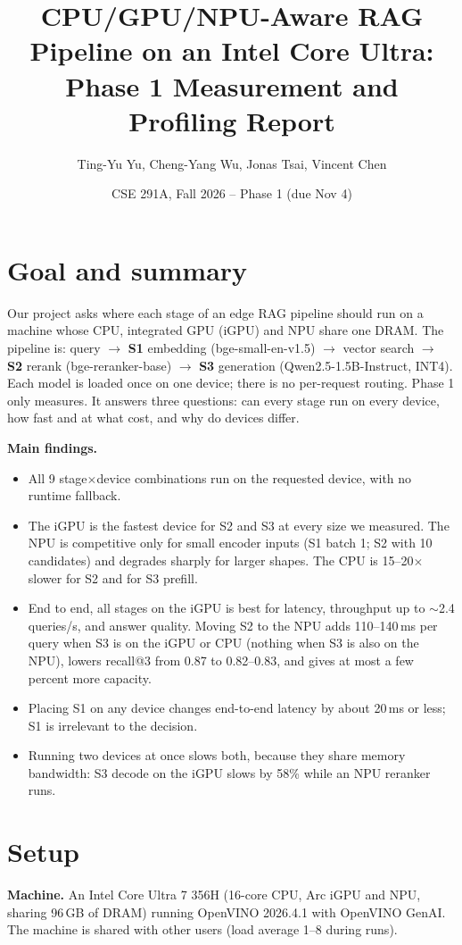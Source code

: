 \documentclass[10pt]{article}
\title{\vspace{-1em}CPU/GPU/NPU-Aware RAG Pipeline on an Intel Core Ultra:\\Phase 1 Measurement and Profiling Report}
\author{Ting-Yu Yu, Cheng-Yang Wu, Jonas Tsai, Vincent Chen}
\date{CSE 291A, Fall 2026 \;--\; Phase 1 (due Nov 4)}
\begin{document}
\maketitle
\vspace{-2em}

\section{Goal and summary}
Our project asks where each stage of an edge RAG pipeline should run on a machine whose CPU, integrated GPU (iGPU) and NPU share one DRAM. The pipeline is: query $\rightarrow$ \textbf{S1} embedding (bge-small-en-v1.5) $\rightarrow$ vector search $\rightarrow$ \textbf{S2} rerank (bge-reranker-base) $\rightarrow$ \textbf{S3} generation (Qwen2.5-1.5B-Instruct, INT4). Each model is loaded once on one device; there is no per-request routing. Phase 1 only measures. It answers three questions: can every stage run on every device, how fast and at what cost, and why do devices differ.

\textbf{Main findings.}
\begin{itemize}\setlength\itemsep{0pt}
\item All 9 stage$\times$device combinations run on the requested device, with no runtime fallback.
\item The iGPU is the fastest device for S2 and S3 at every size we measured. The NPU is competitive only for small encoder inputs (S1 batch 1; S2 with 10 candidates) and degrades sharply for larger shapes. The CPU is 15--20$\times$ slower for S2 and for S3 prefill.
\item End to end, all stages on the iGPU is best for latency, throughput up to $\sim$2.4 queries/s, and answer quality. Moving S2 to the NPU adds 110--140\,ms per query when S3 is on the iGPU or CPU (nothing when S3 is also on the NPU), lowers recall@3 from 0.87 to 0.82--0.83, and gives at most a few percent more capacity.
\item Placing S1 on any device changes end-to-end latency by about 20\,ms or less; S1 is irrelevant to the decision.
\item Running two devices at once slows both, because they share memory bandwidth: S3 decode on the iGPU slows by 58\% while an NPU reranker runs.
\end{itemize}

\section{Setup}
\textbf{Machine.} An Intel Core Ultra 7 356H (16-core CPU, Arc iGPU and NPU, sharing 96\,GB of DRAM) running OpenVINO 2026.4.1 with OpenVINO GenAI. The machine is shared with other users (load average 1--8 during runs).
\end{document}
